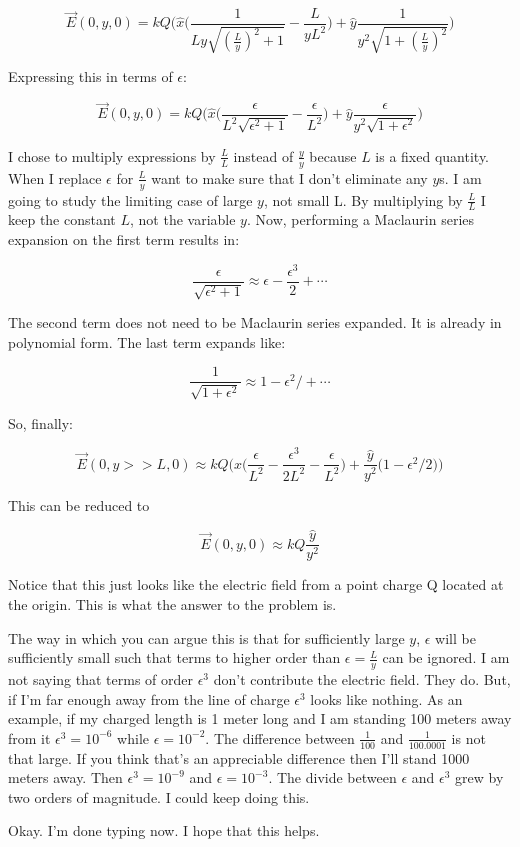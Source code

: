 \begin{homeworkProblem}[Problem 23.42]
\[ \vec{E}(0,y,0) = k Q \bigg( \hat{x} \big( \frac{1}{L y\sqrt{(\frac{L}{y})^2+ 1}} - \frac{L}{y L^2} \big) + \hat{y} \frac{1}{y^2 \sqrt{1+(\frac{L}{y})^2}} \bigg) \]

Expressing this in terms of $\epsilon$:

\[ \vec{E}(0,y,0) = k Q \bigg( \hat{x} \big( \frac{\epsilon}{L^2 \sqrt{\epsilon^2+ 1}} - \frac{\epsilon}{L^2} \big) + \hat{y} \frac{\epsilon}{y^2 \sqrt{1+\epsilon^2}} \bigg) \]

I chose to multiply expressions by $ \frac{L}{L}$ instead of $\frac{y}{y}$ because $L$ is a fixed quantity. When I replace $\epsilon$ for $\frac{L}{y}$ want to make sure that I don't eliminate any $y$s. I am going to study the limiting case of large $y$, not small L. By multiplying by $\frac{L}{L}$ I keep the constant $L$, not the variable $y$. Now, performing a Maclaurin series expansion on the first term results in:

\[ \frac{\epsilon}{\sqrt{\epsilon^2+1}} \approx \epsilon - \frac{\epsilon^3}{2} + \cdots \]

The second term does not need to be Maclaurin series expanded. It is already in polynomial form. The last term expands like:

\[ \frac{1}{\sqrt{1+\epsilon^2}} \approx 1 - \epsilon^2/ + \cdots \]

So, finally:

\[ \vec{E}(0,y>>L,0) \approx k Q \bigg( \hat{x} \big( \frac{\epsilon}{L^2} -\frac{\epsilon^3}{2 L^2} - \frac{\epsilon}{L^2} \big) + \frac{\hat{y}}{y^2} \big( 1 - \epsilon^2/2 \big) \bigg) \]

This can be reduced to 

\[ \vec{E}(0,y,0) \approx k Q  \frac{\hat{y}}{y^2} \]

Notice that this just looks like the electric field from a point charge Q located at the origin. This is what the answer to the problem is. 

The way in which you can argue this is that for sufficiently large $y$, $\epsilon$ will be sufficiently small such that terms to higher order than $\epsilon = \frac{L}{y}$ can be ignored. I am not saying that terms of order $\epsilon^3$ don't contribute the electric field. They do. But, if I'm far enough away from the line of charge $\epsilon^3$ looks like nothing. As an example, if my charged length is 1 meter long and I am standing 100 meters away from it $\epsilon^3 = 10^ {-6}$ while $\epsilon = 10^{-2}$. The difference between $\frac{1}{100}$ and $\frac{1}{100.0001}$ is not that large. If you think that's an appreciable difference then I'll stand 1000 meters away. Then $\epsilon^3 = 10^{-9}$ and $\epsilon = 10^{-3}$. The divide between $\epsilon$ and $\epsilon^3$ grew by two orders of magnitude. I could keep doing this.

Okay. I'm done typing now. I hope that this helps.

\end{homeworkProblem}